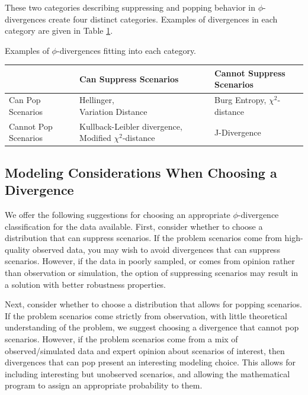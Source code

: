 \documentclass[ijoc,letterpaper]{informs3} %
\begin{document}
These two categories describing suppressing and popping behavior in $\phi$-divergences create four distinct categories.
Examples of divergences in each category are given in Table \ref{tb:phi_categories}.

\begin{table}
	\TABLE
	{
		Examples of $\phi$-divergences fitting into each category.
		\label{tb:phi_categories}
	}
	{\begin{tabular}{l|p{}p{}}
		 & Can Suppress Scenarios & Cannot Suppress Scenarios \\
		 \hline
		 Can Pop Scenarios %
			& \parbox{.33\textwidth}{Hellinger,\\Variation Distance} %
			& \parbox{.33\textwidth}{Burg Entropy,\\$\chi^2$-distance} \smallskip \\
		 Cannot Pop Scenarios %
			& \parbox{.33\textwidth}{Kullback-Leibler divergence,\\Modified $\chi^2$-distance} %
			& \parbox{.33\textwidth}{J-Divergence}
	\end{tabular}}
	{}
\end{table}

\subsection{Modeling Considerations When Choosing a Divergence}
\label{ssec:modeling}

We offer the following suggestions for choosing an appropriate $\phi$-divergence classification for the data available.
First, consider whether to choose a distribution that can suppress scenarios.
If the problem scenarios come from high-quality observed data, you may wish to avoid divergences that can suppress scenarios.
However, if the data in poorly sampled, or comes from opinion rather than observation or simulation, the option of suppressing scenarios may result in a solution with better robustness properties.

Next, consider whether to choose a distribution that allows for popping scenarios.
If the problem scenarios come strictly from observation, with little theoretical understanding of the problem, we suggest choosing a divergence that cannot pop scenarios.
However, if the problem scenarios come from a mix of observed/simulated data and expert opinion about scenarios of interest, then divergences that can pop present an interesting modeling choice.
This allows for including interesting but unobserved scenarios, and allowing the mathematical program to assign an appropriate probability to them.
\end{document}
